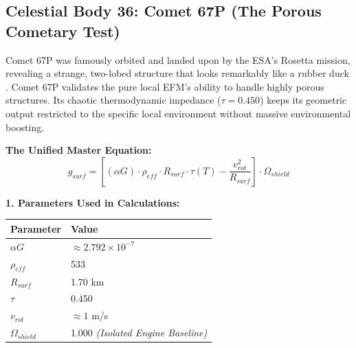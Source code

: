 \documentclass[11pt, a4paper]{article}
\begin{document}
\clearpage
\subsection{Celestial Body 36: Comet 67P (The Porous Cometary Test)}
  Comet 67P was famously orbited and landed upon by the ESA's Rosetta mission, revealing a strange, two-lobed structure that looks remarkably like a rubber duck \cite{sierks2015}. Comet 67P validates the pure local EFM's ability to handle highly porous structures. Its chaotic thermodynamic impedance ($\tau = 0.450$) keeps its geometric output restricted to the specific local environment without massive environmental boosting.

  \vspace{0.5em}
  \noindent \textbf{The Unified Master Equation:}
  $$ g_{surf} = \left[ (\alpha G) \cdot \rho_{eff} \cdot R_{surf} \cdot \tau(T) - \frac{v_{rot}^2}{R_{surf}} \right] \cdot \Omega_{shield} $$

  \vspace{0.5em}
  \noindent \textbf{1. Parameters Used in Calculations:} \\[0.5em]
  \begingroup
  \renewcommand{\arraystretch}{1.3}
  \hspace*{2em}
  \begin{tabular}{|l|l|}
    \hline
    \textbf{Parameter} & \textbf{Value} \\ \hline
    $\alpha G$ & $\approx 2.792 \times 10^{-7}$ \\ \hline
    $\rho_{eff}$ & 533 \\ \hline
    $R_{surf}$ & 1.70 km \\ \hline
    $\tau$ & 0.450 \\ \hline
    $v_{rot}$ & $\approx 1$ m/s \\ \hline
    $\Omega_{shield}$ & 1.000 \textit{(Isolated Engine Baseline)} \\ \hline
  \end{tabular}
  \endgroup
\end{document}
